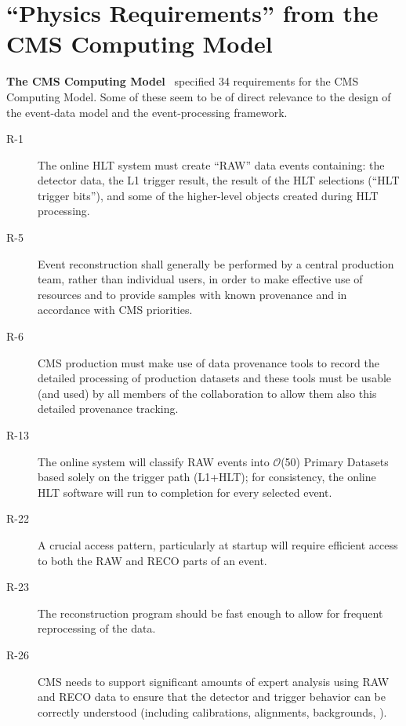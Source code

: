 \documentclass[draftmode]{memarticle}
\newcommand{\order}[1]{$\mathcal{O}$(#1)}
\begin{document}
\section{``Physics Requirements'' from the CMS Computing Model}

\textbf{The CMS Computing Model}~\cite{CMSCM} specified 34 requirements
for the CMS Computing Model.
Some of these seem to be of direct relevance
to the design of the event-data model
and the event-processing framework.

\begin{description}

\item[R-1]
The online HLT system must create ``RAW'' data events containing:
the detector data,
the L1 trigger result,
the result of the HLT selections
(``HLT trigger bits''), and
some of the higher-level objects created during HLT processing.

\item[R-5]
Event reconstruction
shall generally be performed
by a central production team,
rather than individual users,
in order to make effective use of resources
and to provide samples
with known provenance
and in accordance with CMS priorities.

\item[R-6]
CMS production must make use of data provenance tools
to record the detailed processing of production datasets
and these tools must be usable
(and used)
by all members of the collaboration
to allow them also this detailed provenance tracking.

\item[R-13]
The online system
will classify RAW events into \order{50} Primary Datasets
based solely on the trigger path (L1+HLT);
for consistency,
the online HLT software will run to completion for every selected event.

\item[R-22]
A crucial access pattern,
particularly at startup
will require efficient access
to both the RAW and RECO parts of an event.

\item[R-23]
The reconstruction program should be fast enough
to allow for frequent reprocessing of the data.

\item[R-26]
CMS needs to support significant amounts of expert analysis
using RAW and RECO data
to ensure that the detector and trigger behavior
can be correctly understood
(including calibrations, alignments, backgrounds, \etc).


\end{description}
\end{document}
